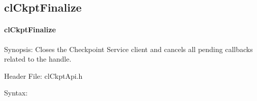 \begin{flushleft}
\subsection{clCkptFinalize}
\hypertarget{pageckpt102}{}\paragraph{cl\-Ckpt\-Finalize}\label{pageckpt102}
\begin{Desc}
\item[Synopsis:]Closes the Checkpoint Service client and cancels all pending callbacks related to the handle.\end{Desc}
\begin{Desc}
\item[Header File:]clCkptApi.h\end{Desc}
\begin{Desc}
\item[Syntax:]


\end{Desc}
\end{flushleft}

